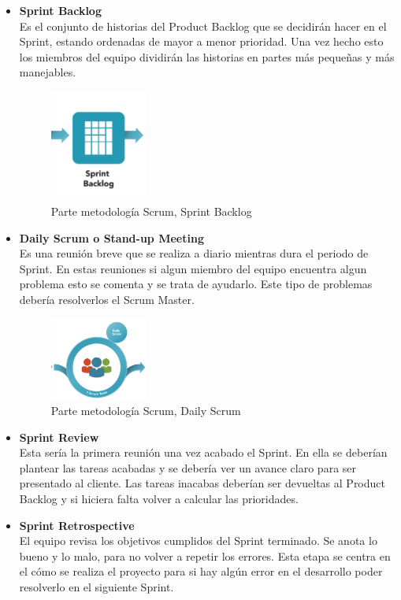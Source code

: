 \begin{itemize}
\item \textbf{Sprint Backlog}\\
Es el conjunto de historias del Product Backlog que se decidirán hacer en el Sprint, estando ordenadas de mayor a menor prioridad. Una vez hecho esto los miembros del equipo dividirán las historias en partes más pequeñas y más manejables.

\begin{figure}[H]
		\centering
		\includegraphics[width=0.3\textwidth] {sprint.png}
		\caption{Parte metodología Scrum, Sprint Backlog }\label{fig:sprint}
	\end{figure} 

 
 
\item \textbf{Daily Scrum o Stand-up Meeting}\\
Es una reunión breve que se realiza a diario mientras dura el periodo de Sprint. 
En estas reuniones si algun miembro del equipo encuentra algun problema esto se comenta y se trata de ayudarlo. Este tipo de problemas debería resolverlos el Scrum Master.

\begin{figure}[H]
		\centering
		\includegraphics[width=0.3\textwidth] {daily.png}
		\caption{Parte metodología Scrum, Daily Scrum }\label{fig:daily}
	\end{figure} 

\item\textbf{ Sprint Review}\\
Esta sería la primera reunión una vez acabado el Sprint. En ella se deberían plantear las tareas acabadas y se debería ver un avance claro para ser presentado al cliente. Las tareas inacabas deberían ser devueltas al Product Backlog y si hiciera falta volver a calcular las prioridades.

 \item \textbf{Sprint Retrospective}\\
  El equipo revisa los objetivos cumplidos del Sprint terminado. Se anota lo bueno y lo malo, para no volver a repetir los errores. Esta etapa se centra en el cómo se realiza el proyecto para si hay algún error en el desarrollo poder resolverlo en el siguiente Sprint.
\end{itemize}



